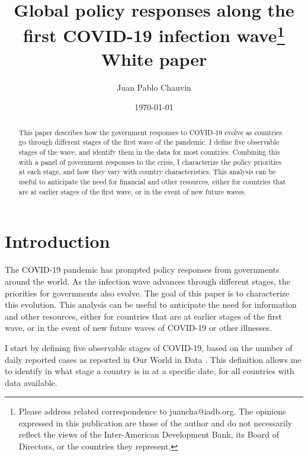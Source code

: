 \documentclass[12pt,english]{article}
\title{{\Large{}Global policy responses along the first COVID-19 infection wave\footnote{Please address related correspondence to juancha@iadb.org. The opinions expressed in this publication are those of the author and do not necessarily reflect the views of the Inter-American Development Bank, its Board of Directors, or the countries they represent.} \\ White paper}}
\author{Juan Pablo Chauvin}
\affil{Research Department, Inter-American Development Bank}
\begin{document}
\begin{titlepage}

\date{\today\\
\vspace{-10bp}
}

\maketitle
\begin{abstract}
\noindent


This paper describes how the government responses to  COVID-19 evolve as countries go through different stages of the first wave of the pandemic.  I define five observable stages of the wave, and identify them in the data for most countries. Combining this with a panel of government responses to the crisis, I characterize the policy priorities at each stage, and how they vary with country characteristics. This analysis can be useful to anticipate the need for financial and other resources, either for countries that are at earlier stages of the first wave, or in the event of new future waves.



\bigskip
\end{abstract}
\setcounter{page}{0}
\thispagestyle{empty}
\end{titlepage}
\pagebreak \newpage


\onehalfspace


\section{Introduction}

The COVID-19 pandemic has prompted policy responses from governments around the world.  As the infection wave advances through different stages, the priorities for governments also evolve.  The goal of this paper is to characterize this evolution.  This analysis can be useful to anticipate the need for information and other resources, either for countries that are at earlier stages of the first wave, or in the event of new future waves of COVID-19 or other illnesses.

I start by defining five observable stages of COVID-19, based on the number of daily reported cases as reported in Our World in Data \citep{Roser2020}.  This definition allows me to identify in what stage a country is in at a specific date, for all countries with data available.
\end{document}

